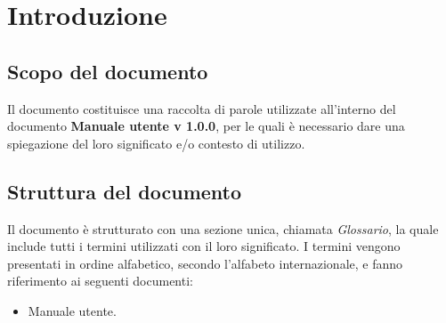 \section{Introduzione}

\subsection{Scopo del documento}
Il documento costituisce una raccolta di parole utilizzate all'interno del documento \textbf{Manuale utente v 1.0.0}, per le quali è necessario dare una spiegazione del loro significato e/o contesto di utilizzo.

\subsection{Struttura del documento}
Il documento è strutturato con una sezione unica, chiamata \textit{Glossario}, la quale include tutti i termini utilizzati con il loro significato. I termini vengono presentati in ordine alfabetico, secondo l'alfabeto internazionale, e fanno riferimento ai seguenti documenti:
\begin{itemize}
	\item Manuale utente.
\end{itemize}
